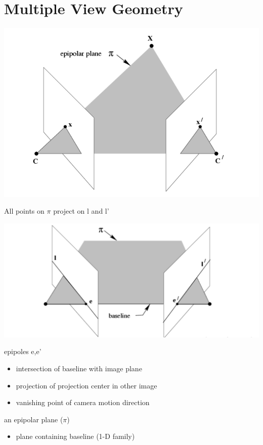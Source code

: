 \section{Multiple View Geometry}

\includegraphics[width=\columnwidth]{pictures/epipolarplane}

All points on $\pi$ project on l and l’

\includegraphics[width=\columnwidth]{pictures/epipolarplane2}

epipoles e,e’
\begin{itemize}
	\item intersection of baseline with image plane
	\item projection of projection center in other image
	\item vanishing point of camera motion direction\\
	\end{itemize}

an epipolar plane ($\pi$)
\begin{itemize}
	\item plane containing baseline (1-D family)\\
\end{itemize}

